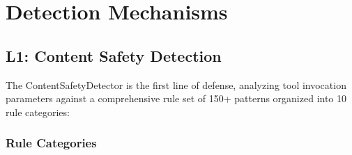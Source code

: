 \documentclass[10pt,conference]{IEEEtran}
\begin{document}
\section{Detection Mechanisms}

\subsection{L1: Content Safety Detection}

The ContentSafetyDetector is the first line of defense, analyzing tool invocation parameters against a comprehensive rule set of 150+ patterns organized into 10 rule categories:

\subsubsection{Rule Categories}
\end{document}
